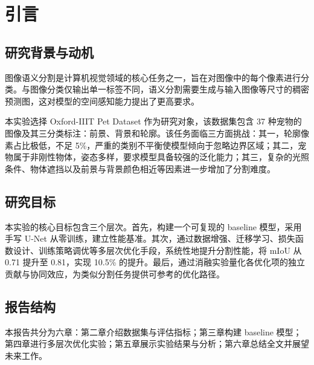 \chapter{引言}
\label{chap:introduction}

\section{研究背景与动机}

图像语义分割是计算机视觉领域的核心任务之一，旨在对图像中的每个像素进行分类。与图像分类仅输出单一标签不同，语义分割需要生成与输入图像等尺寸的稠密预测图，这对模型的空间感知能力提出了更高要求。

本实验选择 Oxford-IIIT Pet Dataset 作为研究对象，该数据集包含 37 种宠物的图像及其三分类标注：前景、背景和轮廓。该任务面临三方面挑战：其一，轮廓像素占比极低，不足 5\%，严重的类别不平衡使模型倾向于忽略边界区域；其二，宠物属于非刚性物体，姿态多样，要求模型具备较强的泛化能力；其三，复杂的光照条件、物体遮挡以及前景与背景颜色相近等因素进一步增加了分割难度。

\section{研究目标}

本实验的核心目标包含三个层次。首先，构建一个可复现的 baseline 模型，采用手写 U-Net 从零训练，建立性能基准。其次，通过数据增强、迁移学习、损失函数设计、训练策略调优等多层次优化手段，系统性地提升分割性能，将 mIoU 从 0.71 提升至 0.81，实现 10.5\% 的提升。最后，通过消融实验量化各优化项的独立贡献与协同效应，为类似分割任务提供可参考的优化路径。

\section{报告结构}

本报告共分为六章：第二章介绍数据集与评估指标；第三章构建 baseline 模型；第四章进行多层次优化实验；第五章展示实验结果与分析；第六章总结全文并展望未来工作。
